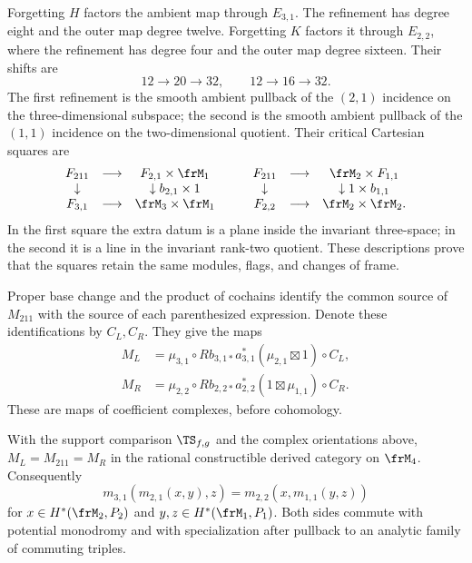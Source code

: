 Forgetting $H$ factors the ambient map through $E_{3,1}$.
The refinement has degree eight and the outer map degree twelve.
Forgetting $K$ factors it through $E_{2,2}$, where the refinement
has degree four and the outer map degree sixteen. Their shifts are
\[
            12\longrightarrow20\longrightarrow32,
       \qquad 12\longrightarrow16\longrightarrow32.
\]
The first refinement is the smooth ambient pullback of the
$(2,1)$ incidence on the three-dimensional subspace; the second is
the smooth ambient pullback of the $(1,1)$ incidence on the
two-dimensional quotient. Their critical Cartesian squares are
\[
\begin{array}{ccc}
 \cF_{211}&\longrightarrow&\cF_{2,1}\times\frM_1\\
 \downarrow&&\downarrow b_{2,1}\times1\\
 \cF_{3,1}&\longrightarrow&\frM_3\times\frM_1
\end{array}
 \qquad
\begin{array}{ccc}
 \cF_{211}&\longrightarrow&\frM_2\times\cF_{1,1}\\
 \downarrow&&\downarrow1\times b_{1,1}\\
 \cF_{2,2}&\longrightarrow&\frM_2\times\frM_2.
\end{array}
\]
In the first square the extra datum is a plane inside the invariant
three-space; in the second it is a line in the invariant rank-two
quotient. These descriptions prove that the squares retain the
same modules, flags, and changes of frame.

Proper base change and the product of cochains identify the common
source of $M_{211}$ with the source of each parenthesized expression.
Denote these identifications by $C_L,C_R$. They give the maps
\[
\begin{split}
 M_L&=\mu_{3,1}\circ Rb_{3,1*}a_{3,1}^*(\mu_{2,1}\boxtimes1)\circ C_L,\\
 M_R&=\mu_{2,2}\circ Rb_{2,2*}a_{2,2}^*(1\boxtimes\mu_{1,1})\circ C_R.
\end{split}
\]
These are maps of coefficient complexes, before cohomology.

\begin{theorem}
\label{ts22:thm:assoc211}
With the support comparison $\TS_{f,g}$ and the complex orientations
above, $M_L=M_{211}=M_R$ in the rational constructible derived
category on $\frM_4$. Consequently
\[
 m_{3,1}(m_{2,1}(x,y),z)=m_{2,2}(x,m_{1,1}(y,z))
\]
for $x\in H^*(\frM_2,\cP_2)$ and $y,z\in H^*(\frM_1,\cP_1)$.
Both sides commute with potential monodromy and with specialization
after pullback to an analytic family of commuting triples.
\end{theorem}

